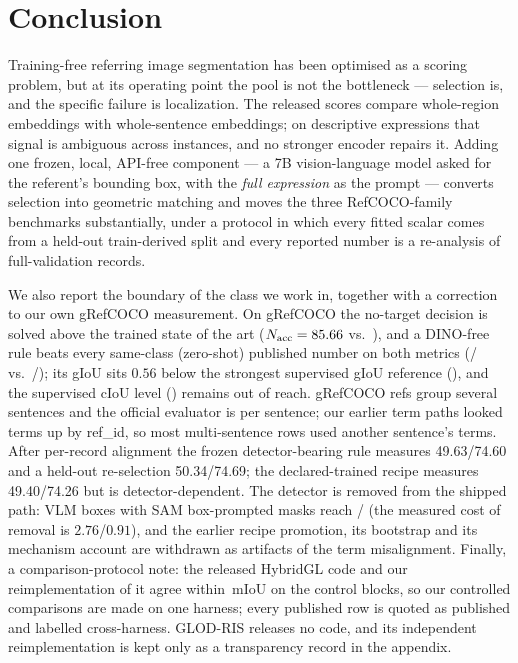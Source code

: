 \section{Conclusion}
\label{sec:conclusion}

Training-free referring image segmentation has been optimised as a scoring
problem, but at its operating point the pool is not the bottleneck ---
selection is, and the specific failure is localization. The released scores
compare whole-region embeddings with whole-sentence embeddings; on
descriptive expressions that signal is ambiguous across instances, and no
stronger encoder repairs it. Adding one frozen, local, API-free component ---
a 7B vision-language model asked for the referent's bounding box, with the
\emph{full expression} as the prompt --- converts selection into geometric
matching and moves the three RefCOCO-family benchmarks substantially, under a
protocol in which every fitted scalar comes from a held-out train-derived
split and every reported number is a re-analysis of full-validation records.

We also report the boundary of the class we work in, together with a
correction to our own gRefCOCO measurement. On gRefCOCO the no-target
decision is solved above the trained state of the art
($N_{\mathrm{acc}}=85.66$ vs.\ \wallTrainedNAcc), and a DINO-free rule
beats every same-class (zero-shot) published number on both metrics
(\grefCIoU{}/\grefGIoU{} vs.\ \grefZeroShotCIoU{}/\grefZeroShotGIoU); its
gIoU sits $0.56$ below the strongest supervised gIoU reference
(\grefPubGIoU), and the supervised cIoU level (\grefPubCIoU) remains out of
reach. gRefCOCO refs group several sentences and the official evaluator is
per sentence; our earlier term paths looked terms up by ref\_id, so most
multi-sentence rows used another sentence's terms. After per-record
alignment the frozen detector-bearing rule measures 49.63/74.60 and a
held-out re-selection 50.34/74.69; the declared-trained recipe measures
49.40/74.26 but is detector-dependent. The detector is removed from the
shipped path: VLM boxes with SAM box-prompted masks reach
\grefCIoU{}/\grefGIoU{} (the measured cost of removal is $2.76$/$0.91$), and
the earlier recipe promotion, its bootstrap and its mechanism account are
withdrawn as artifacts of the term misalignment. Finally, a comparison-protocol note: the released
HybridGL code and our reimplementation of it agree within \reproAgree\,mIoU on
the control blocks, so our controlled comparisons are made on one harness;
every published row is quoted as published and labelled cross-harness.
GLOD-RIS releases no code, and its independent reimplementation is kept only
as a transparency record in the appendix.
